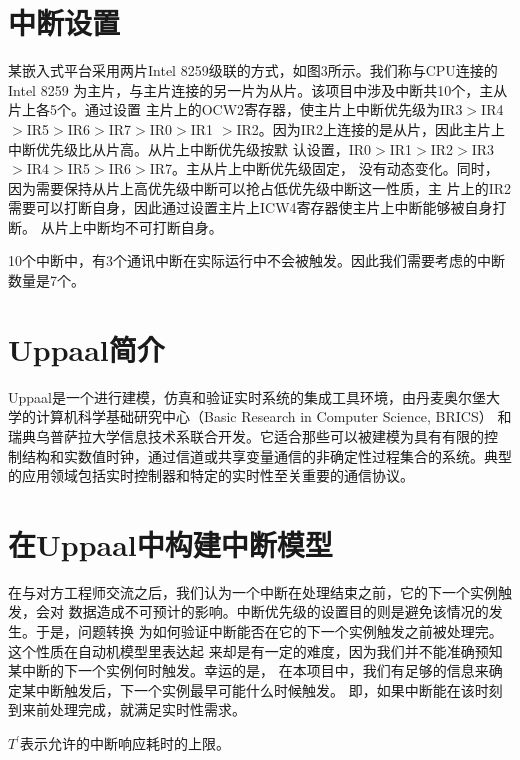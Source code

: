 \section{中断设置}
\label{sec:intr_setting}

某嵌入式平台采用两片Intel 8259级联的方式，如图3所示。我们称与CPU连接的Intel 8259
为主片，与主片连接的另一片为从片。该项目中涉及中断共10个，主从片上各5个。通过设置
主片上的OCW2寄存器，使主片上中断优先级为IR3$>$IR4$>$IR5$>$IR6$>$IR7$>$IR0$>$IR1
$>$IR2。因为IR2上连接的是从片，因此主片上中断优先级比从片高。从片上中断优先级按默
认设置，IR0$>$IR1$>$IR2$>$IR3$>$IR4$>$IR5$>$IR6$>$IR7。主从片上中断优先级固定，
没有动态变化。同时，因为需要保持从片上高优先级中断可以抢占低优先级中断这一性质，主
片上的IR2需要可以打断自身，因此通过设置主片上ICW4寄存器使主片上中断能够被自身打断。
从片上中断均不可打断自身。

10个中断中，有3个通讯中断在实际运行中不会被触发。因此我们需要考虑的中断数量是7个。

\section{Uppaal简介}
\label{sec:Uppaal_intro}

Uppaal是一个进行建模，仿真和验证实时系统的集成工具环境，由丹麦奥尔堡大
学的计算机科学基础研究中心（Basic Research in Computer Science, BRICS）
和瑞典乌普萨拉大学信息技术系联合开发。它适合那些可以被建模为具有有限的控
制结构和实数值时钟，通过信道或共享变量通信的非确定性过程集合的系统。典型
的应用领域包括实时控制器和特定的实时性至关重要的通信协议。\cite{uppaal}

\section{在Uppaal中构建中断模型}
\label{sec:build}

在与对方工程师交流之后，我们认为一个中断在处理结束之前，它的下一个实例触发，会对
数据造成不可预计的影响。中断优先级的设置目的则是避免该情况的发生。于是，问题转换
为如何验证中断能否在它的下一个实例触发之前被处理完。这个性质在自动机模型里表达起
来却是有一定的难度，因为我们并不能准确预知某中断的下一个实例何时触发。幸运的是，
在本项目中，我们有足够的信息来确定某中断触发后，下一个实例最早可能什么时候触发。
即，如果中断能在该时刻到来前处理完成，就满足实时性需求。

\begin{definition}
	$T^\prime$表示允许的中断响应耗时的上限。
	\label{def:T_prime}
\end{definition}

